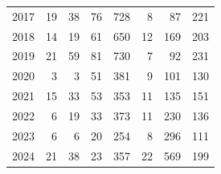\documentclass[
]{article}
\begin{document}
\begin{longtable}{rrrrrrrr}
2017 & 19 & 38 & 76 & 728 & 8 & 87 & 221 \\ 
2018 & 14 & 19 & 61 & 650 & 12 & 169 & 203 \\ 
2019 & 21 & 59 & 81 & 730 & 7 & 92 & 231 \\ 
2020 & 3 & 3 & 51 & 381 & 9 & 101 & 130 \\ 
2021 & 15 & 33 & 53 & 353 & 11 & 135 & 151 \\ 
2022 & 6 & 19 & 33 & 373 & 11 & 230 & 136 \\ 
2023 & 6 & 6 & 20 & 254 & 8 & 296 & 111 \\ 
2024 & 21 & 38 & 23 & 357 & 22 & 569 & 199 \\ 
\bottomrule

\end{longtable}

\endgroup

\newpage{}

\begingroup
\fontsize{9.0pt}{11.0pt}\selectfont
\end{document}
